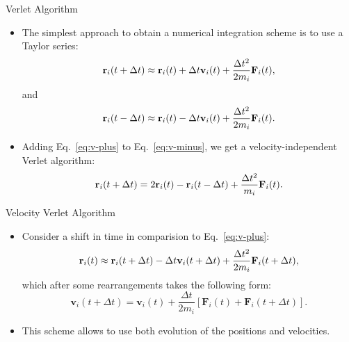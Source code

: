 \documentclass[10pt]{beamer}
\begin{document}
\begin{frame}{Verlet Algorithm}
\begin{itemize}
\setlength\itemsep{1em}
  \item The simplest approach to obtain a numerical integration scheme is to use a Taylor series:
  \begin{equation}
  \label{eq:v-plus}
    {\bf r}_i(t+\Delta t) \approx {\bf r}_i(t) + \Delta t \mathbf{v}_i(t) + \frac{\Delta t^2}{2m_i}\mathbf{F}_i(t),
  \end{equation}
  and
  \begin{equation}
  \label{eq:v-minus}
    {\bf r}_i(t-\Delta t) \approx {\bf r}_i(t) - \Delta t \mathbf{v}_i(t) + \frac{\Delta t^2}{2m_i}\mathbf{F}_i(t).
  \end{equation}

  \item Adding Eq.~\ref{eq:v-plus} to Eq.~\ref{eq:v-minus}, we get a velocity-independent Verlet algorithm:
  \begin{equation}
    {\bf r}_i(t+\Delta t) = 2{\bf r}_i(t) - {\bf r}_i(t-\Delta t) + \frac{\Delta t^2}{m_i}\mathbf{F}_i(t).
  \end{equation}
\end{itemize}
\end{frame}

\begin{frame}{Velocity Verlet Algorithm}
\begin{itemize}
\setlength\itemsep{1em}
  \item Consider a shift in time in comparision to Eq.~\ref{eq:v-plus}:
  \begin{equation}
    {\bf r}_i(t) \approx {\bf r}_i(t+\Delta t) - \Delta t \mathbf{v}_i(t+\Delta t) + \frac{\Delta t^2}{2m_i}\mathbf{F}_i(t+\Delta t),
  \end{equation}
  which after some rearrangements takes the following form:
  \begin{equation}
    \mathbf{v}_i(t+\Delta t) = \mathbf{v}_i(t) + \frac{\Delta t}{2m_i}\left[ \mathbf{F}_i(t) + \mathbf{F}_i(t+\Delta t) \right].
  \end{equation}

  \item This scheme allows to use both evolution of the positions and velocities.
\end{itemize}
\end{frame}

\end{document}

